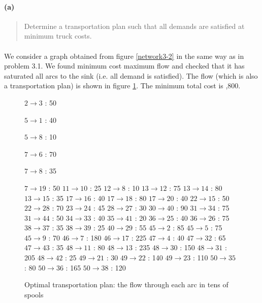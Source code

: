 \paragraph{(a)}
\begin{quote}
Determine a transportation plan such that all demands are satisfied at minimum truck costs.
\end{quote}

\paragraph{}
We consider a graph obtained from figure \ref{network3-2} in the same way as in problem 3.1. We found minimum cost maximum flow and checked that it has saturated all arcs to the sink (i.e. all demand is satisfied). The flow (which is also a transportation plan) is shown in figure \ref{flow3-2a}. The minimum total cost is ,800.

\begin{figure}[H]
\centering
\begin{multicols}{5}
$ 2 \rightarrow 3 $ : 50

$ 5 \rightarrow 1 $ : 40

$ 5 \rightarrow 8 $ : 10

$ 7 \rightarrow 6 $ : 70

$ 7 \rightarrow 8 $ : 35

$ 7 \rightarrow 19 $ : 50
$ 11 \rightarrow 10 $ : 25
$ 12 \rightarrow 8 $ : 10
$ 13 \rightarrow 12 $ : 75
$ 13 \rightarrow 14 $ : 80
$ 13 \rightarrow 15 $ : 35
$ 17 \rightarrow 16 $ : 40
$ 17 \rightarrow 18 $ : 80
$ 17 \rightarrow 20 $ : 40
$ 22 \rightarrow 15 $ : 50
$ 22 \rightarrow 28 $ : 70
$ 23 \rightarrow 24 $ : 45
$ 28 \rightarrow 27 $ : 30
$ 30 \rightarrow 40 $ : 90
$ 31 \rightarrow 34 $ : 75
$ 31 \rightarrow 44 $ : 50
$ 34 \rightarrow 33 $ : 40
$ 35 \rightarrow 41 $ : 20
$ 36 \rightarrow 25 $ : 40
$ 36 \rightarrow 26 $ : 75
$ 38 \rightarrow 37 $ : 35
$ 38 \rightarrow 39 $ : 25
$ 40 \rightarrow 29 $ : 55
$ 45 \rightarrow 2 $ : 85
$ 45 \rightarrow 5 $ : 75
$ 45 \rightarrow 9 $ : 70
$ 46 \rightarrow 7 $ : 180
$ 46 \rightarrow 17 $ : 225
$ 47 \rightarrow 4 $ : 40
$ 47 \rightarrow 32 $ : 65
$ 47 \rightarrow 43 $ : 35
$ 48 \rightarrow 11 $ : 80
$ 48 \rightarrow 13 $ : 235
$ 48 \rightarrow 30 $ : 150
$ 48 \rightarrow 31 $ : 205
$ 48 \rightarrow 42 $ : 25
$ 49 \rightarrow 21 $ : 30
$ 49 \rightarrow 22 $ : 140
$ 49 \rightarrow 23 $ : 110
$ 50 \rightarrow 35 $ : 80
$ 50 \rightarrow 36 $ : 165
$ 50 \rightarrow 38 $ : 120
\end{multicols}
\caption{Optimal transportation plan: the flow through each arc in tens of spools}
\label{flow3-2a}
\end{figure}

